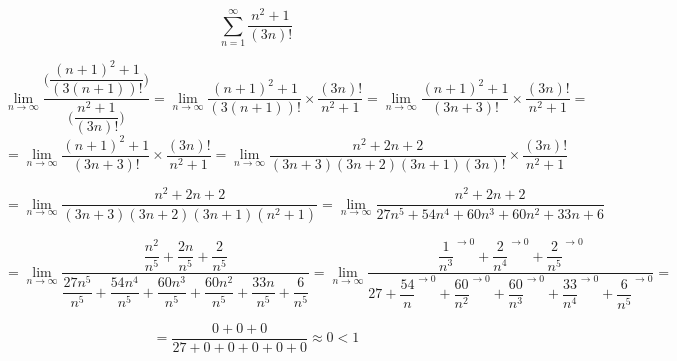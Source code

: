 {}

$$
\sum_{n=1}^\infty \dfrac{n^2+1}{(3n)!}
$$


$$
 \lim_{n \to \infty} \dfrac{ \Big( \dfrac{(n+1)^2+1}{(3(n+1))!} \Big) }{ \Big( \dfrac{n^2+1}{(3n)!} \Big) }
=  \lim_{n \to \infty}  \dfrac{(n+1)^2+1}{(3(n+1))!} \times \dfrac{(3n)!}{n^2+1}
=  \lim_{n \to \infty}  \dfrac{(n+1)^2+1}{(3n+3)!} \times \dfrac{(3n)!}{n^2+1} =
$$
$$
=  \lim_{n \to \infty}  \dfrac{(n+1)^2+1}{(3n+3)!} \times \dfrac{(3n)!}{n^2+1}
= \lim_{n \to \infty}  \dfrac{n^2+2n+2}{(3n+3)(3n+2)(3n+1)(3n)!} \times \dfrac{(3n)!}{n^2+1}
$$

$$
= \lim_{n \to \infty}  \dfrac{n^2+2n+2}{(3n+3)(3n+2)(3n+1)(n^2+1)}
= \lim_{n \to \infty}  \dfrac{n^2+2 n+2}{27 n^5 + 54 n^4 + 60 n^3 + 60 n^2 + 33 n + 6}
$$

$$
= \lim_{n \to \infty}  \dfrac{ \dfrac{n^2}{n^5}+\dfrac{2n}{n^5}+\dfrac{2}{n^5}}{\dfrac{27 n^5}{n^5} + \dfrac{54 n^4}{n^5} + \dfrac{60 n^3}{n^5} + \dfrac{60 n^2}{n^5} + \dfrac{33 n}{n^5} + \dfrac{6}{n^5}}
= \lim_{n \to \infty}  \dfrac{ \dfrac{1}{n^3}^{\to0}+\dfrac{2}{n^4}^{\to0}+\dfrac{2}{n^5}^{\to0}}{27 + \dfrac{54}{n}^{\to0} + \dfrac{60}{n^2}^{\to0} + \dfrac{60}{n^3}^{\to0} + \dfrac{33}{n^4}^{\to0} + \dfrac{6}{n^5}^{\to0}} =
$$

$$
= \dfrac{ 0 + 0 + 0}{27 + 0 + 0 + 0 + 0 + 0 } \approx  \boxed{0} < 1
$$

